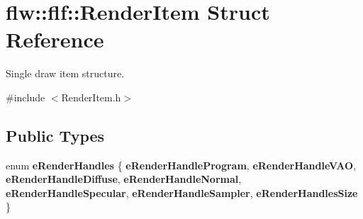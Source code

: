 \hypertarget{structflw_1_1flf_1_1RenderItem}{}\section{flw\+:\+:flf\+:\+:Render\+Item Struct Reference}
\label{structflw_1_1flf_1_1RenderItem}


Single draw item structure.  




{\ttfamily \#include $<$Render\+Item.\+h$>$}

\subsection*{Public Types}
\begin{DoxyCompactItemize}
\item 
\mbox{\label{structflw_1_1flf_1_1RenderItem_aa6b3d77e6446873ee9dcfc072b7c62a0}} 
enum {\bfseries e\+Render\+Handles} \{ \newline
{\bfseries e\+Render\+Handle\+Program}, 
{\bfseries e\+Render\+Handle\+V\+AO}, 
{\bfseries e\+Render\+Handle\+Diffuse}, 
{\bfseries e\+Render\+Handle\+Normal}, 
\newline
{\bfseries e\+Render\+Handle\+Specular}, 
{\bfseries e\+Render\+Handle\+Sampler}, 
{\bfseries e\+Render\+Handles\+Size}
 \}
\end{DoxyCompactItemize}
